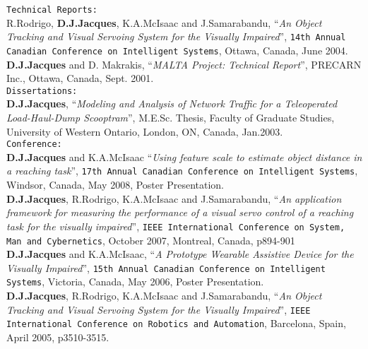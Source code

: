 \texttt{\large Technical Reports:}\\[1.66ex]
R.Rodrigo, \textbf{D.J.Jacques}, K.A.McIsaac and J.Samarabandu, ``\textit{An Object Tracking and Visual Servoing System for the Visually Impaired}'', \texttt{14th Annual Canadian Conference on Intelligent Systems}, Ottawa, Canada, June 2004.\\[1.66ex]
	
\textbf{D.J.Jacques} and D. Makrakis, ``\textit{MALTA Project: Technical Report}'', PRECARN Inc., Ottawa, Canada, Sept. 2001.\\[1.66ex]

\texttt{\large Dissertations:}\\[1.66ex]
\textbf{D.J.Jacques}, ``\textit{Modeling and Analysis of Network Traffic for a Teleoperated Load-Haul-Dump Scooptram}'', M.E.Sc. Thesis, Faculty of Graduate Studies, University of Western Ontario, London, ON, Canada, Jan.2003.\\[1.66ex]

\texttt{\large Conference:}\\[1.66ex]
\textbf{D.J.Jacques} and K.A.McIsaac ``\textit{Using feature scale to estimate object distance in a reaching task}'', \texttt{17th Annual Canadian Conference on Intelligent Systems}, Windsor, Canada, May 2008, Poster Presentation.\\[1.66ex]

\textbf{D.J.Jacques}, R.Rodrigo, K.A.McIsaac and J.Samarabandu, ``\textit{An application framework for measuring the performance of a visual servo control of a reaching task for the visually impaired}'', \texttt{IEEE International Conference on System, Man and Cybernetics}, October 2007, Montreal, Canada, p894-901\\[1.66ex]

\textbf{D.J.Jacques} and K.A.McIsaac, ``\textit{A Prototype Wearable Assistive Device for the Visually Impaired}'', \texttt{15th Annual Canadian Conference on Intelligent Systems}, Victoria, Canada, May 2006, Poster Presentation.\\[1.66ex]

\textbf{D.J.Jacques}, R.Rodrigo, K.A.McIsaac and J.Samarabandu, ``\textit{An Object Tracking and Visual Servoing System for the Visually Impaired}'', \texttt{IEEE International Conference on Robotics and Automation}, Barcelona, Spain, April 2005, p3510-3515.\\[1.66ex]
	
